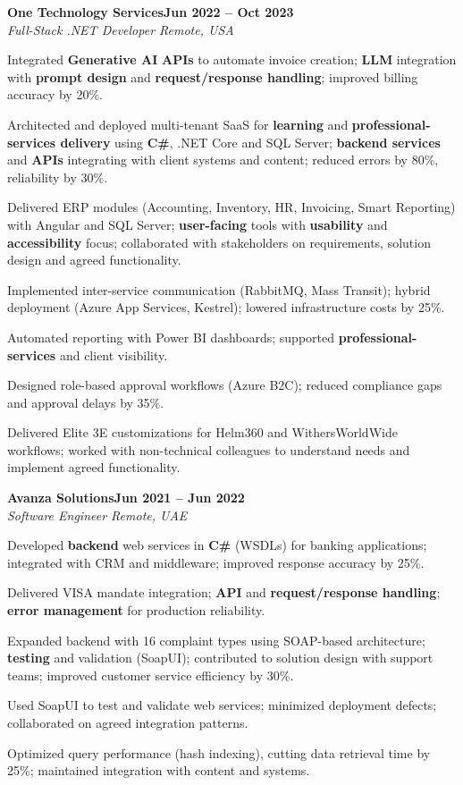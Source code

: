 \documentclass[letterpaper,10pt]{article}
\newcommand{\headingBf}[2]{
  \hspace{10pt}\textbf{#1}\hfill\textbf{#2}\\
}
\newcommand{\headingIt}[2]{
  \hspace{10pt}\textit{#1}\hfill\textit{#2}\\
}
\newenvironment{resume_list}{
  \vspace{-7pt}
  \begin{itemize}[itemsep=-2px, parsep=1pt, leftmargin=30pt]
}{
  \end{itemize}
}
\begin{document}
\headingBf{One Technology Services}{Jun 2022 -- Oct 2023}
\headingIt{Full-Stack .NET Developer \hfill Remote, USA}{}
\begin{resume_list}
    \item Integrated \textbf{Generative AI} \textbf{APIs} to automate invoice creation; \textbf{LLM} integration with \textbf{prompt design} and \textbf{request/response handling}; improved billing accuracy by 20\%.
    \item Architected and deployed multi-tenant SaaS for \textbf{learning} and \textbf{professional-services delivery} using \textbf{C\#}, .NET Core and SQL Server; \textbf{backend services} and \textbf{APIs} integrating with client systems and content; reduced errors by 80\%, reliability by 30\%.
    \item Delivered ERP modules (Accounting, Inventory, HR, Invoicing, Smart Reporting) with Angular and SQL Server; \textbf{user-facing} tools with \textbf{usability} and \textbf{accessibility} focus; collaborated with stakeholders on requirements, solution design and agreed functionality.
    \item Implemented inter-service communication (RabbitMQ, Mass Transit); hybrid deployment (Azure App Services, Kestrel); lowered infrastructure costs by 25\%.
    \item Automated reporting with Power BI dashboards; supported \textbf{professional-services} and client visibility.
    \item Designed role-based approval workflows (Azure B2C); reduced compliance gaps and approval delays by 35\%.
    \item Delivered Elite 3E customizations for Helm360 and WithersWorldWide workflows; worked with non-technical colleagues to understand needs and implement agreed functionality.
\end{resume_list}

\headingBf{Avanza Solutions}{Jun 2021 -- Jun 2022}
\headingIt{Software Engineer \hfill Remote, UAE}{}
\begin{resume_list}
    \item Developed \textbf{backend} web services in \textbf{C\#} (WSDLs) for banking applications; integrated with CRM and middleware; improved response accuracy by 25\%.
    \item Delivered VISA mandate integration; \textbf{API} and \textbf{request/response handling}; \textbf{error management} for production reliability.
    \item Expanded backend with 16 complaint types using SOAP-based architecture; \textbf{testing} and validation (SoapUI); contributed to solution design with support teams; improved customer service efficiency by 30\%.
    \item Used SoapUI to test and validate web services; minimized deployment defects; collaborated on agreed integration patterns.
    \item Optimized query performance (hash indexing), cutting data retrieval time by 25\%; maintained integration with content and systems.
\end{resume_list}
\end{document}
